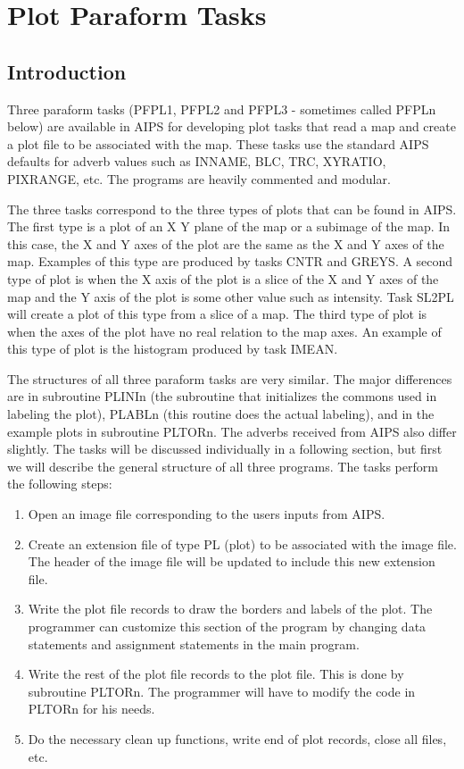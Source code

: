 \section{Plot Paraform Tasks}

\subsection{Introduction}
Three paraform tasks (PFPL1, PFPL2 and
PFPL3 - sometimes called PFPLn below) are available in
AIPS for developing plot tasks that read a map and create a plot file
to be associated with the map. These tasks use the standard AIPS
defaults for adverb values such as INNAME, BLC, TRC, XYRATIO, PIXRANGE,
etc.  The programs are heavily commented and modular.

The three tasks correspond to the three types of plots that can be
found in AIPS. The first type is a plot of an X Y plane of the map or
a subimage of the map.  In this case, the X and Y axes of the plot are
the same as the X and Y axes of the map. Examples of this type are
produced by tasks CNTR and GREYS.  A second type of plot is when the X
axis of the plot is a slice of the X and Y axes of the map and the Y
axis of the plot is some other value such as intensity. Task SL2PL
will create a plot of this type from a slice of a map. The third type
of plot is when the axes of the plot have no real relation to the map
axes.  An example of this type of plot is the histogram produced by
task IMEAN.

The structures of all three paraform tasks are very similar.  The
major differences are in subroutine PLINIn (the subroutine that
initializes the commons used in labeling the plot), PLABLn (this
routine does the actual labeling), and in the example plots in
subroutine PLTORn.  The adverbs received from AIPS also differ
slightly.  The tasks will be discussed individually in a following
section, but first we will describe the general structure of all three
programs. The tasks perform the following steps:
\begin{enumerate} %
\item Open an image file corresponding to the users inputs from AIPS.
\item Create an extension file  of type PL (plot) to be associated with the
image file.  The header of the image file will be updated to include this
new extension file.
\item Write the plot file records to draw the borders and labels of the
plot.  The programmer can customize this section of the program by
changing data statements and assignment statements in the main
program.
\item Write the rest of the plot file records to the plot file. This is done
by subroutine PLTORn.  The programmer will have to modify the code in
PLTORn for his needs.
\item Do the necessary clean up functions, write end of plot records, close
all files, etc.

\end{enumerate} %

